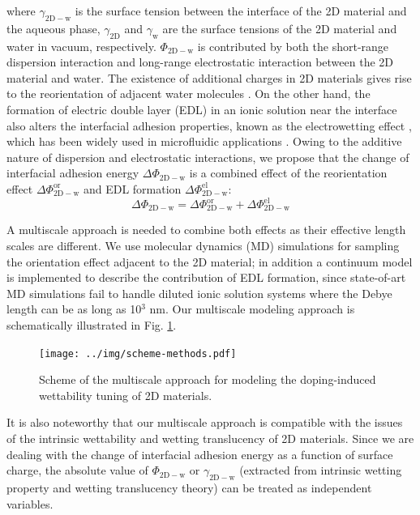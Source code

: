 \documentclass[aps,prl,reprint,groupedaddress,amsmath,amssymb, showpacs]{revtex4-1}
\begin{document}
where \(\gamma_{\mathrm{2D-w}}\) is the surface tension between the
interface of the 2D material and the aqueous phase,
\(\gamma_{\mathrm{2D}}\) and \(\gamma_{\mathrm{w}}\) are the surface
tensions of the 2D material and water in vacuum,
respectively. \(\Phi_{\mathrm{2D-w}}\) is contributed by both the
short-range dispersion interaction and long-range electrostatic
interaction between the 2D material and water. The existence of
additional charges in 2D materials gives rise to the reorientation of
adjacent water molecules \cite{ostrowski_tunable_2014}. On the other
hand, the formation of electric double layer (EDL) in an ionic
solution near the interface also alters the interfacial adhesion
properties, known as the electrowetting effect \cite{Lippmann_1908},
which has been widely used in microfluidic applications
\cite{Mugele_2005}.  Owing to the additive nature of dispersion and
electrostatic interactions, we propose that the change of interfacial
adhesion energy \(\Delta \Phi_{\mathrm{2D-w}}\) is a combined effect of
the reorientation effect \(\Delta \Phi_{\mathrm{2D-w}}^{\mathrm{or}}\) and EDL
formation \(\Delta \Phi_{\mathrm{2D-w}}^{\mathrm{el}}\):
\begin{equation}
\label{eqn:contrib-adhesion-change}
\Delta \Phi_{\mathrm{2D-w}} = \Delta \Phi_{\mathrm{2D-w}}^{\mathrm{or}}
                              + \Delta \Phi_{\mathrm{2D-w}}^{\mathrm{el}}
\end{equation}

A multiscale approach is needed to combine both effects as their
effective length scales are different. We use molecular dynamics (MD)
simulations for sampling the orientation effect adjacent to the 2D
material; in addition a continuum model is implemented to describe the
contribution of EDL formation, since state-of-art MD simulations fail to
handle diluted ionic solution systems where the Debye length can be as
long as 10\(^{\text{3}}\) nm. Our multiscale modeling approach is schematically illustrated in Fig. \ref{fig:scheme-method}.

\begin{figure}[htbp]
\centering
\texttt{[image: ../img/scheme-methods.pdf]}
\caption{\label{fig:scheme-method}
Scheme of the multiscale approach for modeling the doping-induced wettability tuning of 2D materials.}
\end{figure}

It is also noteworthy that our multiscale approach is compatible with
the issues of the intrinsic wettability and wetting translucency of 2D
materials. Since we are dealing with the change of interfacial
adhesion energy as a function of surface charge, the absolute value of
\(\Phi_{\mathrm{2D-w}}\) or \(\gamma_{\mathrm{2D-w}}\) (extracted from intrinsic wetting property and wetting translucency theory) can be treated as
independent variables.
\end{document}
